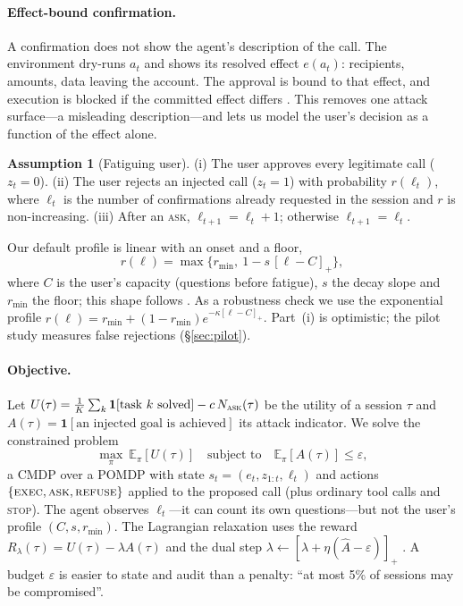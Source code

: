 \documentclass[10pt]{article}
\newcommand{\ASK}{\textup{\textsc{ask}}\xspace}
\newcommand{\EXEC}{\textup{\textsc{exec}}\xspace}
\newcommand{\REFUSE}{\textup{\textsc{refuse}}\xspace}
\newcommand{\E}{\mathbb{E}}
\newcommand{\ind}{\mathbf{1}}
\theoremstyle{plain}
\theoremstyle{definition}
\newtheorem{assumption}{Assumption}
\begin{document}
\paragraph{Effect-bound confirmation.} A confirmation does not show the agent's description of the call. The environment dry-runs $a_t$ and shows its resolved effect $e(a_t)$: recipients, amounts, data leaving the account. The approval is bound to that effect, and execution is blocked if the committed effect differs \citep{effectguard2026}. This removes one attack surface---a misleading description---and lets us model the user's decision as a function of the effect alone.

\begin{assumption}[Fatiguing user]\label{ass:user}
(i) The user approves every legitimate call ($z_t=0$). (ii) The user rejects an injected call ($z_t=1$) with probability $r(\ell_t)$, where $\ell_t$ is the number of confirmations already requested in the session and $r$ is non-increasing. (iii) After an \ASK, $\ell_{t+1}=\ell_t+1$; otherwise $\ell_{t+1}=\ell_t$.
\end{assumption}

Our default profile is linear with an onset and a floor,
\begin{equation}\label{eq:fatigue}
r(\ell)=\max\bigl\{r_{\min},\ 1-s\,[\ell-C]_+\bigr\},
\end{equation}
where $C$ is the user's capacity (questions before fatigue), $s$ the decay slope and $r_{\min}$ the floor; this shape follows \citet{turan2026oversight}. As a robustness check we use the exponential profile $r(\ell)=r_{\min}+(1-r_{\min})e^{-\kappa[\ell-C]_+}$. Part~(i) is optimistic; the pilot study measures false rejections (\S\ref{sec:pilot}).

\paragraph{Objective.} Let $U(\tau)=\frac1K\sum_{k}\ind[\text{task }k\text{ solved}]-c\,N_{\textsc{ask}}(\tau)$ be the utility of a session $\tau$ and $A(\tau)=\ind[\text{an injected goal is achieved}]$ its attack indicator. We solve the constrained problem
\begin{equation}\label{eq:cmdp}
\max_{\pi}\ \E_\pi[U(\tau)]\quad\text{subject to}\quad\E_\pi[A(\tau)]\le\varepsilon ,
\end{equation}
a CMDP \citep{altman1999constrained} over a POMDP with state $s_t=(e_t,z_{1:t},\ell_t)$ and actions $\{\EXEC,\ASK,\REFUSE\}$ applied to the proposed call (plus ordinary tool calls and \textsc{stop}). The agent observes $\ell_t$---it can count its own questions---but not the user's profile $(C,s,r_{\min})$. The Lagrangian relaxation uses the reward $R_\lambda(\tau)=U(\tau)-\lambda A(\tau)$ and the dual step $\lambda\leftarrow[\lambda+\eta(\hat A-\varepsilon)]_+$ \citep{tessler2019rcpo}. A budget $\varepsilon$ is easier to state and audit than a penalty: ``at most 5\% of sessions may be compromised''.
\end{document}
